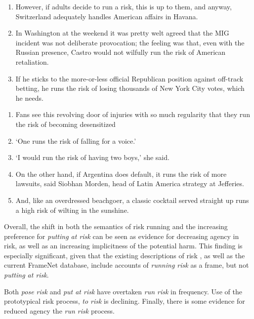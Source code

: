 \begin{multicols}{2}

\begin{enumerate} [before=\color{black}\ttfamily]  \setlength\itemsep{0em} \small
\item However, if adults decide to run a risk, this is up to them, and anyway, Switzerland adequately handles American affairs in Havana.
\item In Washington at the weekend it was pretty welt agreed that the MIG incident was not deliberate provocation; the feeling was that, even with the Russian presence, Castro would not wilfully run the risk of American retaliation.
\item  If he sticks to the more-or-less official Republican position against off-track betting, he runs the risk of losing thousands of New York City votes, which he needs.
\end{enumerate}
%
\begin{enumerate} [before=\color{black}\ttfamily]   \setlength\itemsep{0em} \small
\item Fans see this revolving door of injuries with so much regularity that they run the risk of becoming desensitized 
\item `One runs the risk of falling for a voice.'
\item `I would run the risk of having two boys,' she said.
\item On the other hand, if Argentina does default, it runs the risk of more lawsuits, said Siobhan Morden, head of Latin America strategy at Jefferies.
\item And, like an overdressed beachgoer, a classic cocktail served straight up runs a high risk of wilting in the sunshine.
\end{enumerate}
\end{multicols}
%
\noindent Overall, the shift in both the semantics of risk running and the increasing preference for \emph{putting at risk} can be seen as evidence for decreasing agency in risk, as well as an increasing implicitness of the potential harm. This finding is especially significant, given that the existing descriptions of risk \cite{fillmore_toward_1992}, as well as the current FrameNet database, include accounts of \emph{running risk} as a frame, but not \emph{putting at risk}.

\vspace{5mm}\noindent\begin{tcolorbox}[colback=yellow!5,colframe=yellow!40!black,title=Summary: types of risk processes]
\parbox{1\textwidth}{%
Both \emph{pose risk} and \emph{put at risk} have overtaken \emph{run risk} in frequency. Use of the prototypical risk process, \emph{to risk} is declining. Finally, there is some evidence for reduced agency the \emph{run risk} process.}
\end{tcolorbox}
\vspace{5mm}


